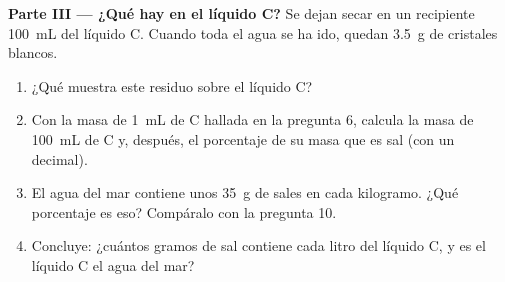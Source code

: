 \begin{problem}
\medskip
\noindent\textbf{Parte III --- ¿Qué hay en el líquido C?}
Se dejan secar en un recipiente \qty{100}{mL} del líquido C. Cuando
toda el agua se ha ido, quedan \qty{3.5}{g} de cristales blancos.
\begin{enumerate}[resume]
  \item ¿Qué muestra este residuo sobre el líquido C?
  \item Con la masa de \qty{1}{mL} de C hallada en la pregunta 6,
        calcula la masa de \qty{100}{mL} de C y, después, el porcentaje
        de su masa que es sal (con un decimal).
  \item El agua del mar contiene unos \qty{35}{g} de sales en cada
        kilogramo. ¿Qué porcentaje es eso? Compáralo con la pregunta 10.
  \item Concluye: ¿cuántos gramos de sal contiene cada litro del
        líquido C, y es el líquido C el agua del mar?
\end{enumerate}
\end{problem}
